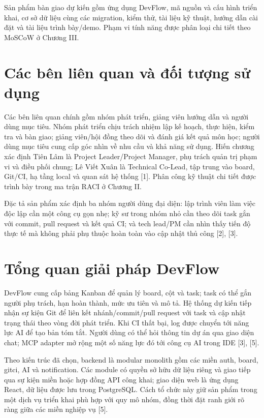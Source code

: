 \documentclass[12pt,a4paper]{report}
\begin{document}
Sản phẩm bàn giao dự kiến gồm ứng dụng DevFlow, mã nguồn và cấu hình triển khai, cơ sở dữ liệu cùng các migration, kiểm thử, tài liệu kỹ thuật, hướng dẫn cài đặt và tài liệu trình bày/demo. Phạm vi tính năng được phân loại chi tiết theo MoSCoW ở Chương III.

\section{Các bên liên quan và đối tượng sử dụng}
Các bên liên quan chính gồm nhóm phát triển, giảng viên hướng dẫn và người dùng mục tiêu. Nhóm phát triển chịu trách nhiệm lập kế hoạch, thực hiện, kiểm tra và bàn giao; giảng viên/hội đồng theo dõi và đánh giá kết quả môn học; người dùng mục tiêu cung cấp góc nhìn về nhu cầu và khả năng sử dụng. Hiến chương xác định Tiên Lâm là Project Leader/Project Manager, phụ trách quản trị phạm vi và điều phối chung; Lê Viết Xuân là Technical Co-Lead, tập trung vào board, Git/CI, hạ tầng local và quan sát hệ thống [1]. Phân công kỹ thuật chi tiết được trình bày trong ma trận RACI ở Chương II.

Đặc tả sản phẩm xác định ba nhóm người dùng đại diện: lập trình viên làm việc độc lập cần một công cụ gọn nhẹ; kỹ sư trong nhóm nhỏ cần theo dõi task gắn với commit, pull request và kết quả CI; và tech lead/PM cần nhìn thấy tiến độ thực tế mà không phải phụ thuộc hoàn toàn vào cập nhật thủ công [2], [3].

\section{Tổng quan giải pháp DevFlow}
DevFlow cung cấp bảng Kanban để quản lý board, cột và task; task có thể gắn người phụ trách, hạn hoàn thành, mức ưu tiên và mô tả. Hệ thống dự kiến tiếp nhận sự kiện Git để liên kết nhánh/commit/pull request với task và cập nhật trạng thái theo vòng đời phát triển. Khi CI thất bại, log được chuyển tới năng lực AI để tạo bản tóm tắt. Người dùng có thể hỏi thông tin dự án qua giao diện chat; MCP adapter mở rộng một số năng lực đó tới công cụ AI trong IDE [3], [5].

Theo kiến trúc đã chọn, backend là modular monolith gồm các miền auth, board, gitci, AI và notification. Các module có quyền sở hữu dữ liệu riêng và giao tiếp qua sự kiện miền hoặc hợp đồng API công khai; giao diện web là ứng dụng React, dữ liệu được lưu trong PostgreSQL. Cách tổ chức này giữ sản phẩm trong một dịch vụ triển khai phù hợp với quy mô nhóm, đồng thời đặt ranh giới rõ ràng giữa các miền nghiệp vụ [5].
\end{document}
